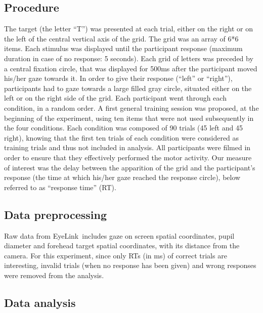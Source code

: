 \documentclass[a4paper,12pt,twoside,openright,oldfontcommands]{memoir}
\begin{document}
\hypertarget{procedure-4}{%
\subsection{Procedure}\label{procedure-4}}

The target (the letter \enquote{T}) was presented at each trial, either on the right or on the left of the central vertical axis of the grid. The grid was an array of 6*6 items. Each stimulus was displayed until the participant response (maximum duration in case of no response: 5 seconds). Each grid of letters was preceded by a central fixation circle, that was displayed for 500ms after the participant moved his/her gaze towards it. In order to give their response (\enquote{left} or \enquote{right}), participants had to gaze towards a large filled gray circle, situated either on the left or on the right side of the grid. Each participant went through each condition, in a random order. A first general training session was proposed, at the beginning of the experiment, using ten items that were not used subsequently in the four conditions. Each condition was composed of 90 trials (45 left and 45 right), knowing that the first ten trials of each condition were considered as training trials and thus not included in analysis. All participants were filmed in order to ensure that they effectively performed the motor activity.
Our measure of interest was the delay between the apparition of the grid and the participant's response (the time at which his/her gaze reached the response circle), below referred to as \enquote{response time} (RT).

\hypertarget{data-preprocessing}{%
\subsection{Data preprocessing}\label{data-preprocessing}}

Raw data from EyeLink\textregistered~includes gaze on screen spatial coordinates, pupil diameter and forehead target spatial coordinates, with its distance from the camera. For this experiment, since only RTs (in ms) of correct trials are interesting, invalid trials (when no response has been given) and wrong responses were removed from the analysis.

\hypertarget{data-analysis-3}{%
\subsection{Data analysis}\label{data-analysis-3}}
\end{document}
